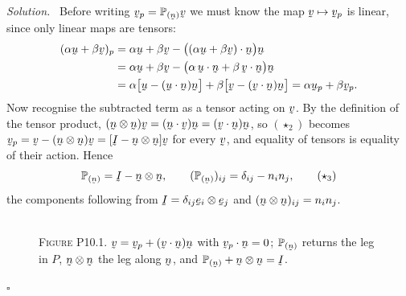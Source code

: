 \documentclass[17pt,a4paper]{extreport}
\DeclareRobustCommand{\vek}[1]{\underaccent{\tilde}{#1}}
\newcommand{\Proj}[1]{\mathbb{P}_{(#1)}}
\newcommand{\I}{\vek{I}}
\newcommand{\bu}{\vek{u}}
\newcommand{\bv}{\vek{v}}
\newcommand{\be}{\vek{e}}
\newcommand{\bn}{\vek{n}}
\newcommand{\dd}{\delta}
\newcommand{\ip}[2]{#1\cdot#2}
\theoremstyle{scplain}
\theoremstyle{scdefn}
\theoremstyle{scplain}
\newenvironment{solution}
 {\par\smallskip\noindent\textit{Solution.}\ }
 {\hfill$\square$\par\medskip}
\begin{document}
\begin{solution}
Before writing $\bv_p=\Proj{\bn}\bv$ we must know the map $\bv\mapsto\bv_p$
is linear, since only linear maps are tensors:
\[
\begin{aligned}
   (\alpha\bu+\beta\bv)_p
   &=\alpha\bu+\beta\bv-\big(\ip{(\alpha\bu+\beta\bv)}{\bn}\big)\bn\\
   &=\alpha\bu+\beta\bv-\big(\alpha\,\ip\bu\bn+\beta\,\ip\bv\bn\big)\bn\\
   &=\alpha\big[\bu-(\ip\bu\bn)\bn\big]+\beta\big[\bv-(\ip\bv\bn)\bn\big]
   =\alpha\bu_p+\beta\bv_p .
\end{aligned}
\]
Now recognise the subtracted term as a tensor acting on $\bv$. By the
definition of the tensor product, $(\bn\otimes\bn)\bv=(\ip\bn\bv)\bn
=(\ip\bv\bn)\bn$, so $(\star_2)$ becomes
$\bv_p=\bv-(\bn\otimes\bn)\bv=[\I-\bn\otimes\bn]\bv$ for every $\bv$, and
equality of tensors is equality of their action. Hence
\begin{equation}
   \Proj{\bn}=\I-\bn\otimes\bn,\qquad
   (\Proj{\bn})_{ij}=\dd_{ij}-n_in_j , \tag{$\star_3$}
\end{equation}
the components following from $\I=\dd_{ij}\be_i\otimes\be_j$ and
$(\bn\otimes\bn)_{ij}=n_in_j$.


\begin{figure}[htbp]\centering
{}
\\[1.2ex]
{\footnotesize\textsc{Figure P10.1.} $\bv=\bv_p+(\ip\bv\bn)\bn$ with
$\ip{\bv_p}\bn=0$; $\Proj{\bn}$ returns the leg in $P$, $\bn\otimes\bn$ the
leg along $\bn$, and $\Proj{\bn}+\bn\otimes\bn=\I$.}
\end{figure}



\end{solution}
\end{document}
